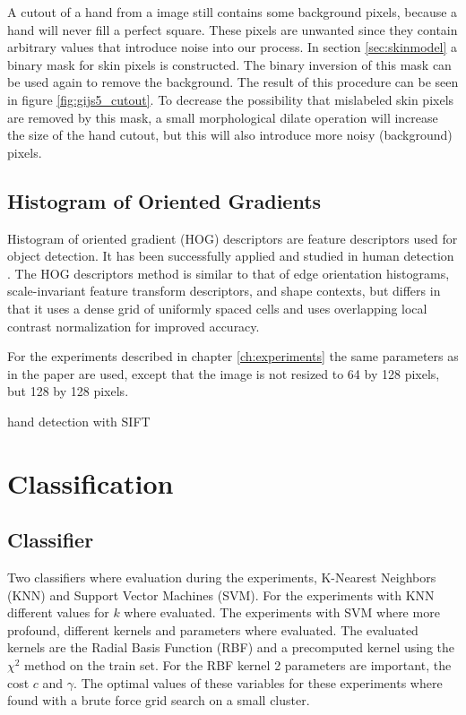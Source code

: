 A cutout of a hand from a image still contains some background pixels, because a hand will never fill a perfect square. These pixels are unwanted since they contain arbitrary values that introduce noise into our process. In section \ref{sec:skinmodel} a binary mask for skin pixels is constructed. The binary inversion of this mask can be used again to remove the background. The result of this procedure can be seen in figure \ref{fig:gijs5_cutout}. To decrease the possibility that mislabeled skin pixels are removed by this mask, a small morphological dilate operation will increase the size of the hand cutout, but this will also introduce more noisy (background) pixels.


\subsection*{Histogram of Oriented Gradients}
Histogram of oriented gradient (HOG) descriptors are feature descriptors used for object detection. It has been successfully applied and studied in human detection \cite{watanabe2009}.  The HOG descriptors method is similar to that of edge orientation histograms, scale-invariant feature transform descriptors, and shape contexts, but differs in that it uses a dense grid of uniformly spaced cells and uses overlapping local contrast normalization for improved accuracy.

For the experiments described in chapter \ref{ch:experiments} the same parameters as in the \cite{watanabe2009} paper are used, except that the image is not resized to 64 by 128 pixels, but 128 by 128 pixels.

hand detection with SIFT\cite{Wang_handposture}

\section{Classification}

\subsection*{Classifier}
Two classifiers where evaluation during the experiments, K-Nearest Neighbors (KNN) and Support Vector Machines (SVM). For the experiments with KNN different values for $k$ where evaluated. The experiments with SVM where more profound, different kernels and parameters where evaluated. The evaluated kernels are the Radial Basis Function (RBF) and a precomputed kernel using the $\chi^2$ method on the train set. For the RBF kernel 2 parameters are important, the cost $c$ and $\gamma$. The optimal values of these variables for these experiments where found with a brute force grid search on a small cluster.

